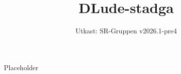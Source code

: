 \documentclass[a4paper]{dtek}
\title{DLude-stadga}
\date{Utkast: SR-Gruppen v2026.1-pre4}
\begin{document}
Placeholder
\end{document}
